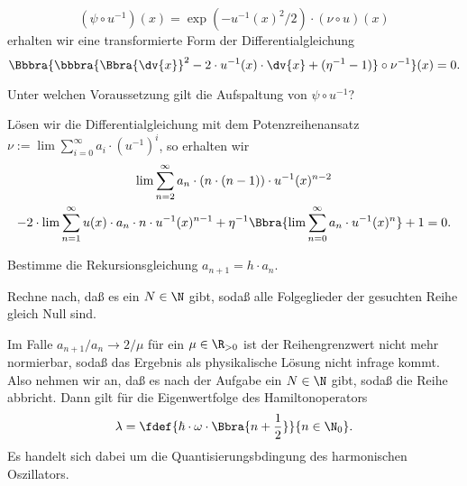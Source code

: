 \documentclass{subfiles}
\begin{document}
    \[(\psi\circ u^{-1})(x) = \exp(-u^{-1}(x)^2/2)\cdot(\nu\circ u)(x)\]
    erhalten wir eine transformierte Form der Differentialgleichung
    \[\Bbbra{\bbbra{\Bbra{\dv{x}}^2-2\cdot u^{-1}(x)\cdot\dv{x} + (\eta^{-1}-1)}\circ\nu^{-1}}(x) = 0.\]
    \begin{Aufgabe}
        \nr{} Unter welchen Voraussetzung gilt die Aufspaltung von $\psi\circ u^{-1}$?
    \end{Aufgabe}
    Lösen wir die Differentialgleichung mit dem Potenzreihenansatz $\nu := \lim\sum_{i=0}^\infty a_i\cdot (u^{-1})^i$, so erhalten wir
    \begin{multline*}
        \lim\sum_{n=2}^\infty a_{n}\cdot (n\cdot (n-1))\cdot u^{-1}(x)^{n-2} \\
        - 2\cdot \lim\sum_{n=1}^\infty u(x)\cdot a_n\cdot n\cdot u^{-1}(x)^{n-1} + \eta^{-1}\Bbra{\lim\sum_{n=0}^\infty a_n\cdot u^{-1}(x)^n} + 1 = 0.
    \end{multline*}
    \begin{Aufgabe}
        \nr{} Bestimme die Rekursionsgleichung $a_{n+1} = h\cdot a_n$.

        \nr{} Rechne nach, daß es ein $N\in\N$ gibt, sodaß alle Folgeglieder der gesuchten Reihe gleich Null sind. 
    \end{Aufgabe}
    Im Falle $a_{n+1}/a_n\to 2/\mu$ für ein $\mu\in\R_{>0}$ ist der Reihengrenzwert nicht mehr normierbar, sodaß das Ergebnis als physikalische Lösung nicht infrage kommt. Also nehmen wir an, daß es nach der Aufgabe ein $N\in\N$ gibt, sodaß die Reihe abbricht. Dann gilt für die Eigenwertfolge des Hamiltonoperators 
    \[\lambda = \fdef{\hbar\cdot\omega\cdot\Bbra{n+\frac{1}{2}}}{n\in\N_0}.\]
    Es handelt sich dabei um die Quantisierungsbdingung des harmonischen Oszillators. 
\end{document}
